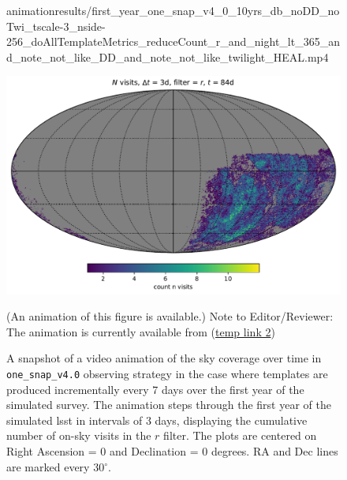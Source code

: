 \documentclass[preprintm,linenumbers]{aastex631}
\newcommand{\baseline}{\texttt{one\_snap\_v4.0}\xspace}
\begin{document}
		\begin{figure}
			\begin{center}
				\begin{interactive}{animation}{results/first_year_one_snap_v4_0_10yrs_db_noDD_noTwi_tscale-3_nside-256_doAllTemplateMetrics_reduceCount_r_and_night_lt_365_and_note_not_like_DD_and_note_not_like_twilight_HEAL.mp4}
				\end{interactive}
				\includegraphics[width=0.5\columnwidth]{results/first_year_one_snap_v4_0_10yrs_db_noDD_noTwi_tscale-3_nside-256_doAllTemplateMetrics_reduceCount_r_and_night_lt_84_and_scheduler_note_not_like_DD_and_scheduler_note_not_like_twilight_HEAL.pdf}
				\caption{A snapshot of a video animation of the sky coverage over time in \baseline observing strategy in the case where templates are produced incrementally every 7 days over the first year of the simulated survey.  
    The animation steps through the first year of the simulated \gls*{lsst} in intervals of 3 days, displaying the cumulative number of on-sky visits in the $r$ filter. 
    The plots are centered on Right Ascension = 0 and Declination = 0 degrees. RA and Dec lines are marked every 30$^\circ$.} (An animation of this figure is available.) Note to Editor/Reviewer: The animation is currently available from (\href{add-new-link}{temp link 2}) \label{animation:7days}
			\end{center}
		\end{figure}
		
\end{document}
